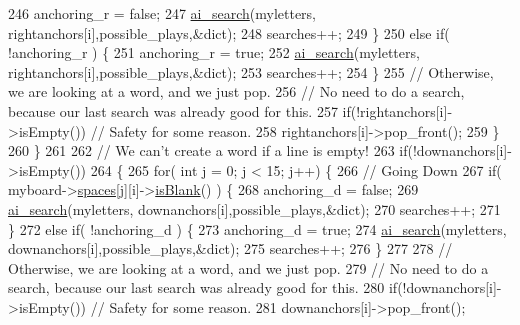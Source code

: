 \begin{DoxyCode}
246                     anchoring\_r = \textcolor{keyword}{false};
247                     \hyperlink{class_a_i_player_af50ad9f1d7a27e87ec67fe9ddb49ef93}{ai\_search}(myletters, rightanchors[i],possible\_plays,&dict);
248                     searches++;
249                 \}
250                 \textcolor{keywordflow}{else} \textcolor{keywordflow}{if}( !anchoring\_r ) \{
251                     anchoring\_r = \textcolor{keyword}{true};
252                     \hyperlink{class_a_i_player_af50ad9f1d7a27e87ec67fe9ddb49ef93}{ai\_search}(myletters, rightanchors[i],possible\_plays,&dict);
253                     searches++;
254                 \}
255                 \textcolor{comment}{// Otherwise, we are looking at a word, and we just pop.}
256                 \textcolor{comment}{// No need to do a search, because our last search was already good for this.}
257                 \textcolor{keywordflow}{if}(!rightanchors[i]->isEmpty()) \textcolor{comment}{// Safety for some reason.}
258                     rightanchors[i]->pop\_front();
259             \}
260         \}
261 
262         \textcolor{comment}{// We can't create a word if a line is empty!}
263         \textcolor{keywordflow}{if}(!downanchors[i]->isEmpty())
264         \{
265             \textcolor{keywordflow}{for}( \textcolor{keywordtype}{int} j = 0; j < 15; j++) \{
266                 \textcolor{comment}{// Going Down}
267                 \textcolor{keywordflow}{if}( myboard->\hyperlink{class_board_a73b12248ddb6ee3adc24f4458d8661c2}{spaces}[j][i]->\hyperlink{class_space_a308f0ef400183df78df69717ca50cfee}{isBlank}() ) \{
268                     anchoring\_d = \textcolor{keyword}{false};
269                     \hyperlink{class_a_i_player_af50ad9f1d7a27e87ec67fe9ddb49ef93}{ai\_search}(myletters, downanchors[i],possible\_plays,&dict);
270                     searches++;
271                 \}
272                 \textcolor{keywordflow}{else} \textcolor{keywordflow}{if}( !anchoring\_d ) \{
273                     anchoring\_d = \textcolor{keyword}{true};
274                     \hyperlink{class_a_i_player_af50ad9f1d7a27e87ec67fe9ddb49ef93}{ai\_search}(myletters, downanchors[i],possible\_plays,&dict);
275                     searches++;
276                 \}
277 
278                 \textcolor{comment}{// Otherwise, we are looking at a word, and we just pop.}
279                 \textcolor{comment}{// No need to do a search, because our last search was already good for this.}
280                 \textcolor{keywordflow}{if}(!downanchors[i]->isEmpty()) \textcolor{comment}{// Safety for some reason.}
281                     downanchors[i]->pop\_front();

\end{DoxyCode}
